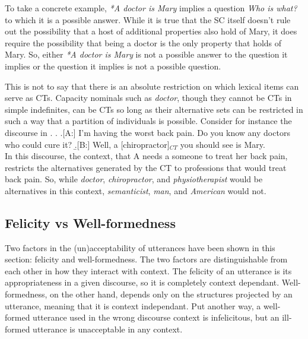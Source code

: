 \documentclass[GPFinal]{subfiles}
\begin{document}
To take a concrete example, \textit{*A doctor is Mary} implies a question \textit{Who is what?} to which it is a possible answer.
While it is true that the SC itself doesn't rule out the possibility that a host of additional properties also hold of Mary, it does require the possibility that being a doctor is the only property that holds of Mary.
So, either \textit{*A doctor is Mary} is not a possible answer to the question it implies or the question it implies is not a possible question.

%

This is not to say that there is an absolute restriction on which lexical items can serve as CTs.
Capacity nominals such as \textit{doctor}, though they cannot be CTs in simple indefinites, can be CTs so long as their alternative sets can be restricted in such a way that a partition of individuals is possible.
Consider for instance the discourse in \Next.
\ex.
\a.[A:] I'm having the worst back pain. Do you know any doctors who could cure it?
\b.[B:] Well, a [chiropractor]$_{CT}$ you should see is Mary.\\

In this discourse, the context, that A needs a someone to treat her back pain, restricts the alternatives generated by the CT to professions that would treat back pain.
So, while \textit{doctor}, \textit{chiropractor}, and \textit{physiotherapist} would be alternatives in this context, \textit{semanticist}, \textit{man}, and \textit{American} would not.


\subsection{Felicity vs Well-formedness}
Two factors in the (un)acceptability of utterances have been shown in this section: felicity and well-formedness.
The two factors are distinguishable from each other in how they interact with context.
The felicity of an utterance is its appropriateness in a given discourse, so it is completely context dependant.
Well-formedness, on the other hand, depends only on the structures projected by an utterance, meaning that it is context independant.
Put another way, a well-formed utterance used in the wrong discourse context is infelicitous, but an ill-formed utterance is unacceptable in any context.
\end{document}
